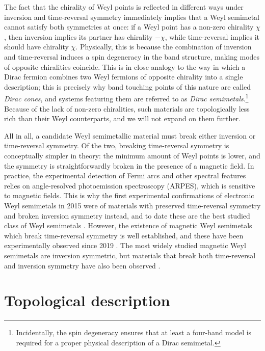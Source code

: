 The fact that the chirality of Weyl points is reflected in different ways under inversion and time-reversal symmetry immediately implies that a Weyl semimetal cannot satisfy both symmetries at once: if a Weyl point has a non-zero chirality $\chi$, then inversion implies its partner has chirality $-\chi$, while time-reversal implies it should have chirality $\chi$. Physically, this is because the combination of inversion and time-reversal induces a spin degeneracy in the band structure, making modes of opposite chiralities coincide. This is in close analogy to the way in which a Dirac fermion combines two Weyl fermions of opposite chirality into a single description; this is precisely why band touching points of this nature are called \emph{Dirac cones}, and systems featuring them are referred to as \emph{Dirac semimetals}.\footnote{
	Incidentally, the spin degeneracy ensures that at least a four-band model is required for a proper physical description of a Dirac semimetal.}
Because of the lack of non-zero chiralities, such materials are topologically less rich than their Weyl counterparts, and we will not expand on them further.

All in all, a candidate Weyl semimetallic material must break either inversion or time-reversal symmetry. Of the two, breaking time-reversal symmetry is conceptually simpler in theory: the minimum amount of Weyl points is lower, and the symmetry is straightforwardly broken in the presence of a magnetic field. In practice, the experimental detection of Fermi arcs and other spectral features relies on angle-resolved photoemission spectroscopy (ARPES), which is sensitive to magnetic fields. This is why the first experimental confirmations of electronic Weyl semimetals in 2015 were of materials with preserved time-reversal symmetry and broken inversion symmetry instead, and to date these are the best studied class of Weyl semimetals  \cite{Xu_TaAs,Xu_TaAp,Yang-TaAs,Weng_WSM-candidates,Huang_WSM-candidates,Lv_WSM-TaAs,Xu_WSM-experiment,Belopolski-TypeII,Belopolski_minimal-WSM}. However, the existence of magnetic Weyl semimetals which break time-reversal symmetry is well established, and these have been experimentally observed since 2019 \cite{Liu_magnetic-WSM,Belopolski_magnetic-WSM,Morali_magnetic-WSM}.
The most widely studied magnetic Weyl semimetals are inversion symmetric, but materials that break both time-reversal and inversion symmetry have also been observed \cite{Sanchez_magnetic-noncentro,Sakhya_magnetric-noncentro,Li_magnetic-noncentro}.


\section{Topological description}\label{sec:semimetal-topology}

